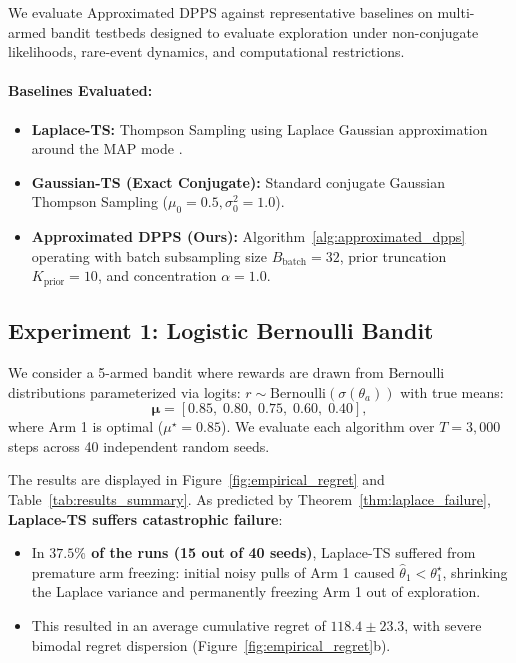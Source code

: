 \documentclass[twoside]{article}
\begin{document}
We evaluate Approximated DPPS against representative baselines on multi-armed bandit testbeds designed to evaluate exploration under non-conjugate likelihoods, rare-event dynamics, and computational restrictions.

\paragraph{Baselines Evaluated:}
\begin{itemize}
    \item \textbf{Laplace-TS:} Thompson Sampling using Laplace Gaussian approximation around the MAP mode \citep{chapelle2011empirical, phan2019thompson}.
    \item \textbf{Gaussian-TS (Exact Conjugate):} Standard conjugate Gaussian Thompson Sampling ($\mu_0 = 0.5, \sigma_0^2 = 1.0$).
    \item \textbf{Approximated DPPS (Ours):} Algorithm~\ref{alg:approximated_dpps} operating with batch subsampling size $B_{\text{batch}} = 32$, prior truncation $K_{\text{prior}} = 10$, and concentration $\alpha = 1.0$.
\end{itemize}

\subsection{Experiment 1: Logistic Bernoulli Bandit}

We consider a 5-armed bandit where rewards are drawn from Bernoulli distributions parameterized via logits: $r \sim \text{Bernoulli}(\sigma(\theta_a))$ with true means:
\begin{equation}
\boldsymbol{\mu} = [0.85, \; 0.80, \; 0.75, \; 0.60, \; 0.40],
\end{equation}
where Arm 1 is optimal ($\mu^\star = 0.85$). We evaluate each algorithm over $T = 3{,}000$ steps across 40 independent random seeds.

The results are displayed in Figure~\ref{fig:empirical_regret} and Table~\ref{tab:results_summary}.
As predicted by Theorem~\ref{thm:laplace_failure}, \textbf{Laplace-TS suffers catastrophic failure}:
\begin{itemize}
    \item In \textbf{$37.5\%$ of the runs (15 out of 40 seeds)}, Laplace-TS suffered from premature arm freezing: initial noisy pulls of Arm 1 caused $\hat{\theta}_1 < \theta_1^\star$, shrinking the Laplace variance and permanently freezing Arm 1 out of exploration.
    \item This resulted in an average cumulative regret of \textbf{$118.4 \pm 23.3$}, with severe bimodal regret dispersion (Figure~\ref{fig:empirical_regret}b).
\end{itemize}
\end{document}
